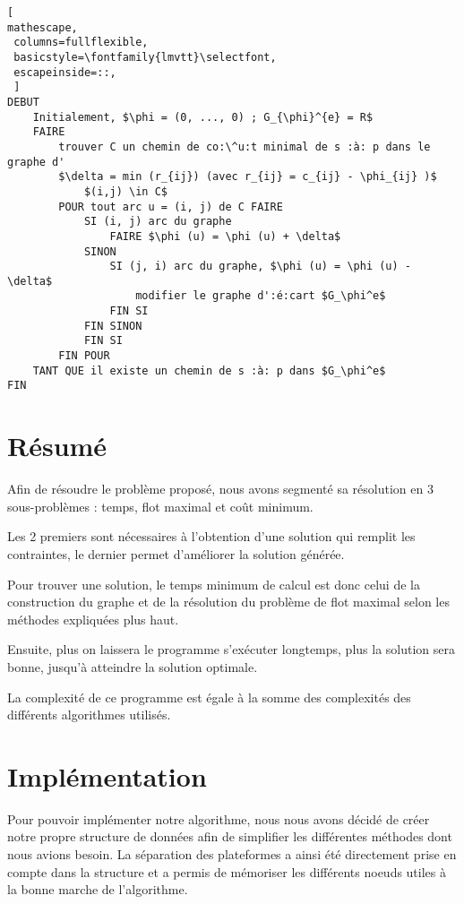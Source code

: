 \documentclass[a4paper,12pt]{article}
\begin{document}
\begin{lstlisting}[
mathescape,
 columns=fullflexible,
 basicstyle=\fontfamily{lmvtt}\selectfont,
 escapeinside=::,
 ]
DEBUT
    Initialement, $\phi = (0, ..., 0) ; G_{\phi}^{e} = R$
    FAIRE
        trouver C un chemin de co:\^u:t minimal de s :à: p dans le graphe d'
        $\delta = min (r_{ij}) (avec r_{ij} = c_{ij} - \phi_{ij} )$
            $(i,j) \in C$
        POUR tout arc u = (i, j) de C FAIRE
            SI (i, j) arc du graphe
                FAIRE $\phi (u) = \phi (u) + \delta$
            SINON
                SI (j, i) arc du graphe, $\phi (u) = \phi (u) - \delta$
                    modifier le graphe d':é:cart $G_\phi^e$
                FIN SI
            FIN SINON
            FIN SI
        FIN POUR
    TANT QUE il existe un chemin de s :à: p dans $G_\phi^e$
FIN
\end{lstlisting}

\section{Résumé}

Afin de résoudre le problème proposé, nous avons segmenté sa résolution en 3 sous-problèmes : temps, flot  maximal et coût minimum. 

Les 2 premiers sont nécessaires à l'obtention d'une solution qui remplit les contraintes, le dernier permet d'améliorer la solution générée. 

Pour trouver une solution, le temps minimum de calcul est donc celui de la construction du graphe et de la résolution du problème de flot maximal selon les méthodes expliquées plus haut. 

Ensuite, plus on laissera le programme s'exécuter longtemps, plus la solution sera bonne, jusqu'à atteindre la solution optimale.

La complexité de ce programme est égale à la somme des complexités des différents algorithmes utilisés.

\section{Implémentation}

Pour pouvoir impl\'ementer notre algorithme, nous nous avons d\'ecid\'e de cr\'eer notre propre structure de donn\'ees afin de simplifier les diff\'erentes m\'ethodes dont nous avions besoin. La s\'eparation des plateformes a ainsi \'et\'e directement prise en compte dans la structure et a permis de m\'emoriser les diff\'erents noeuds utiles \`a la bonne marche de l'algorithme.
\end{document}
